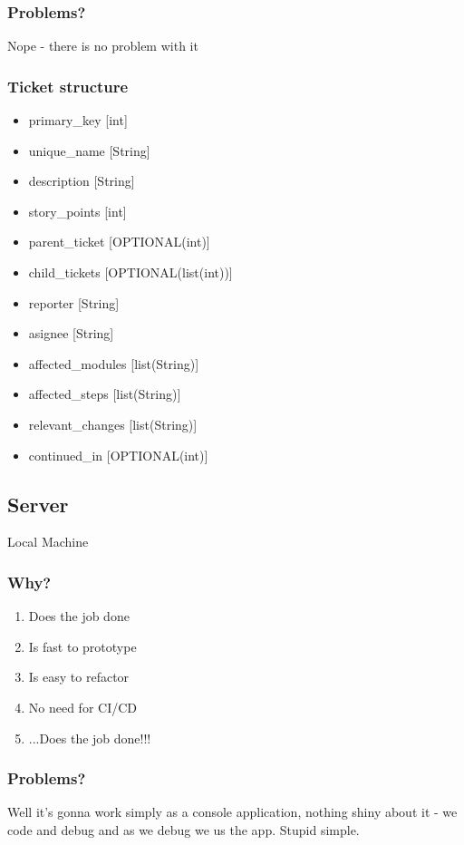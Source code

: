\subsubsection{Problems?}
Nope - there is no problem with it
\subsubsection{Ticket structure}
\begin{itemize}
  \item primary\_key        [int]
  \item unique\_name        [String]
  \item description         [String]
  \item story\_points       [int]
  \item parent\_ticket      [OPTIONAL(int)]
  \item child\_tickets      [OPTIONAL(list(int))]
  \item reporter            [String]
  \item asignee             [String]
  \item affected\_modules   [list(String)]
  \item affected\_steps     [list(String)]
  \item relevant\_changes   [list(String)]
  \item continued\_in       [OPTIONAL(int)]
\end{itemize}

\subsection{Server}\label{SRV:POC}
Local Machine
\subsubsection{Why?}
\begin{enumerate}
    \item Does the job done
    \item Is fast to prototype
    \item Is easy to refactor
    \item No need for CI/CD
    \item ...Does the job done!!!
\end{enumerate}
\subsubsection{Problems?}
Well it's gonna work simply as a console application, nothing shiny about it - we code and debug and as we debug we us the app. Stupid simple. 
\newpage

